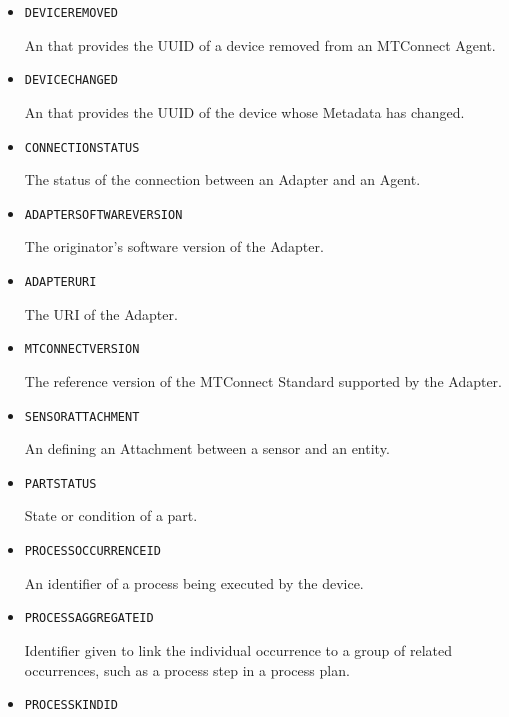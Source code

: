 \begin{itemize}
\item \texttt{DEVICE\textunderscore REMOVED}  

An  that provides the \gls{UUID} of a device removed from an \gls{MTConnect Agent}.


\item \texttt{DEVICE\textunderscore CHANGED}  

An  that provides the \gls{UUID} of the device whose \gls{Metadata} has changed.


\item \texttt{CONNECTION\textunderscore STATUS}  

The status of the connection between an \gls{Adapter} and an \gls{Agent}.


\item \texttt{ADAPTER\textunderscore SOFTWARE\textunderscore VERSION}  

The originator’s software version of the \gls{Adapter}.


\item \texttt{ADAPTER\textunderscore URI}  

The \gls{URI} of the \gls{Adapter}.


\item \texttt{MTCONNECT\textunderscore VERSION}  

The reference version of the MTConnect Standard supported by the \gls{Adapter}.


\item \texttt{SENSOR\textunderscore ATTACHMENT}  

An  defining an \gls{Attachment} between a sensor and an entity.


\item \texttt{PART\textunderscore STATUS}  

State or condition of a part.


\item \texttt{PROCESS\textunderscore OCCURRENCE\textunderscore ID}  

An identifier of a process being executed by the device.


\item \texttt{PROCESS\textunderscore AGGREGATE\textunderscore ID}  

Identifier given to link the individual occurrence to a group of related occurrences, such as a process step in a process plan.


\item \texttt{PROCESS\textunderscore KIND\textunderscore ID}  


\end{itemize}
